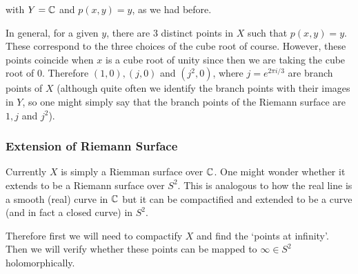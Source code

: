 with $Y = \mathbb{C}$ and $p(x, y) = y$, as we had before.

In general, for a given $y$, there are 3 distinct points in $X$ such that $p(x, y) = y$. These correspond to the three choices of the cube root of course. However, these points coincide when $x$ is a cube root of unity since then we are taking the cube root of 0. Therefore $(1, 0), (j, 0)$ and $(j^2, 0)$, where $j = e^{2\pi i/3}$ are branch points of $X$ (although quite often we identify the branch points with their images in $Y$, so one might simply say that the branch points of the Riemann surface are $1, j$ and $j^2$). 

\subsubsection{Extension of Riemann Surface}
Currently $X$ is simply a Riemman surface over $\mathbb{C}$. One might wonder whether it extends to be a Riemann surface over $S^2$. This is analogous to how the real line is a smooth (real) curve in $\mathbb{C}$ but it can be compactified and extended to be a curve (and in fact a closed curve) in $S^2$.  

Therefore first we will need to compactify $X$ and find the `points at infinity'. Then we will verify whether these points can be mapped to $\infty \in S^2$ holomorphically.

